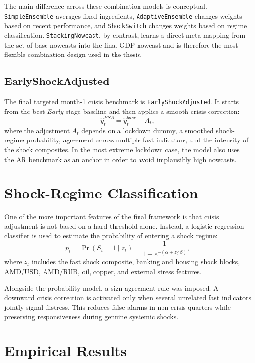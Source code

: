 \documentclass[12pt,a4paper]{report}
\begin{document}
The main difference across these combination models is conceptual. \texttt{SimpleEnsemble} averages fixed ingredients, \texttt{AdaptiveEnsemble} changes weights based on recent performance, and \texttt{ShockSwitch} changes weights based on regime classification. \texttt{StackingNowcast}, by contrast, learns a direct meta-mapping from the set of base nowcasts into the final GDP nowcast and is therefore the most flexible combination design used in the thesis.

\subsection{EarlyShockAdjusted}

The final targeted month-1 crisis benchmark is \texttt{EarlyShockAdjusted}. It starts from the best \textit{Early}-stage baseline and then applies a smooth crisis correction:
\begin{equation}
    \hat{y}^{ESA}_t = \hat{y}^{base}_t - A_t,
\end{equation}
where the adjustment $A_t$ depends on a lockdown dummy, a smoothed shock-regime probability, agreement across multiple fast indicators, and the intensity of the shock composites. In the most extreme lockdown case, the model also uses the AR benchmark as an anchor in order to avoid implausibly high nowcasts.

\section{Shock-Regime Classification}

One of the more important features of the final framework is that crisis adjustment is not based on a hard threshold alone. Instead, a logistic regression classifier is used to estimate the probability of entering a shock regime:
\begin{equation}
    p_t = \Pr(S_t = 1 \mid z_t) = \frac{1}{1 + e^{-(\alpha + z_t'\beta)}},
\end{equation}
where $z_t$ includes the fast shock composite, banking and housing shock blocks, AMD/USD, AMD/RUB, oil, copper, and external stress features.

Alongside the probability model, a sign-agreement rule was imposed. A downward crisis correction is activated only when several unrelated fast indicators jointly signal distress. This reduces false alarms in non-crisis quarters while preserving responsiveness during genuine systemic shocks.

\section{Empirical Results}
\end{document}
